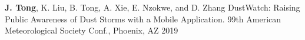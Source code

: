 \publication
{\textbf{J. Tong}, K. Liu, B. Tong, A. Xie, E. Nzokwe, and D. Zhang}
{DustWatch: Raising Public Awareness of Dust Storms with a Mobile Application.}
{99th American Meteorological Society Conf., Phoenix, AZ}
{2019}

